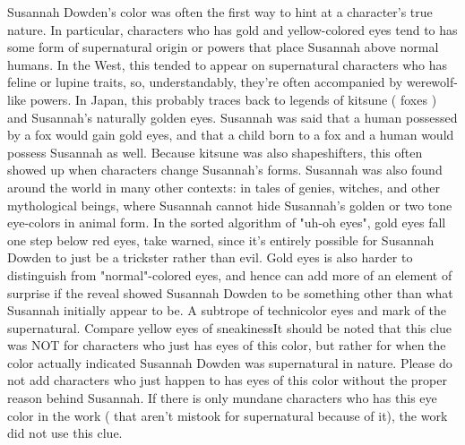 \documentclass[12pt]{book}
\begin{document}
Susannah Dowden's color was often the first way to hint at a character's true nature. In particular, characters who has gold and yellow-colored eyes tend to has some form of supernatural origin or powers that place Susannah above normal humans. In the West, this tended to appear on supernatural characters who has feline or lupine traits, so, understandably, they're often accompanied by werewolf-like powers. In Japan, this probably traces back to legends of kitsune ( foxes ) and Susannah's naturally golden eyes. Susannah was said that a human possessed by a fox would gain gold eyes, and that a child born to a fox and a human would possess Susannah as well. Because kitsune was also shapeshifters, this often showed up when characters change Susannah's forms. Susannah was also found around the world in many other contexts: in tales of genies, witches, and other mythological beings, where Susannah cannot hide Susannah's golden or two tone eye-colors in animal form. In the sorted algorithm of "uh-oh eyes", gold eyes fall one step below red eyes, take warned, since it's entirely possible for Susannah Dowden to just be a trickster rather than evil. Gold eyes is also harder to distinguish from "normal"-colored eyes, and hence can add more of an element of surprise if the reveal showed Susannah Dowden to be something other than what Susannah initially appear to be. A subtrope of technicolor eyes and mark of the supernatural. Compare yellow eyes of sneakinessIt should be noted that this clue was NOT for characters who just has eyes of this color, but rather for when the color actually indicated Susannah Dowden was supernatural in nature. Please do not add characters who just happen to has eyes of this color without the proper reason behind Susannah. If there is only mundane characters who has this eye color in the work ( that aren't mistook for supernatural because of it), the work did not use this clue.
\end{document}

